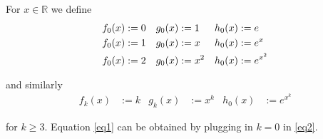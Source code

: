\documentclass[a4paper, 11pt]{report}
\begin{document}
For $x \in \mathbb{R}$ we define
\begin{align}\label{eq1}
    f_0(x)&:=0 & g_0(x)&:=1 & h_0(x)&:=e \\
    f_0(x)&:=1 & g_0(x)&:=x & h_0(x)&:=e^x \notag\\
    f_0(x)&:=2 & g_0(x)&:=x^2 & h_0(x)&:=e^{x^2} \notag
\end{align}

and similarly
\begin{align}\label{eq2}
    f_k(x)&:=k & g_k(x)&:=x^k & h_0(x)&:=e^{x^k}
\end{align}

for $k\ge3$. Equation \eqref{eq1} can be obtained by plugging in $k=0$ in \eqref{eq2}.
\end{document}
